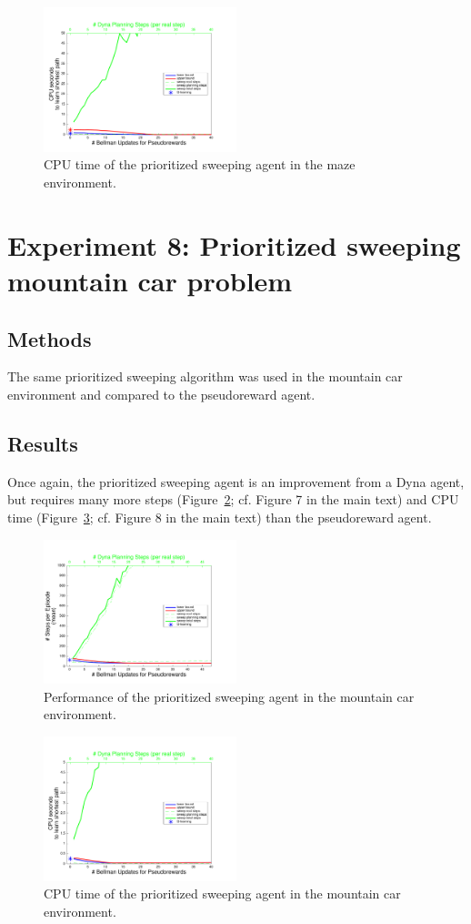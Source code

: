 \documentclass[letterpaper]{article}
\begin{document}
\begin{figure}[ht]
\centering
\includegraphics[width=0.5\textwidth]{cpus_vs_PRiterations_sweeping_toGoal}
\caption{CPU time of the prioritized sweeping agent in the maze environment.}
\label{fig:S5b}
\end{figure}

\section{Experiment 8: Prioritized sweeping mountain car problem}

\subsection{Methods}

The same prioritized sweeping algorithm was used in the mountain car environment and compared to the pseudoreward agent.

\subsection{Results}

Once again, the prioritized sweeping agent is an improvement from a Dyna agent, but requires many more steps (Figure~\ref{fig:S6a}; cf. Figure 7 in the main text) and CPU time (Figure~\ref{fig:S6b}; cf. Figure 8 in the main text) than the pseudoreward agent.

\begin{figure}[ht]
\centering
\includegraphics[width=0.5\textwidth]{MC_learning_vs_PRiterationsSweeping_DYNA_mean}
\caption{Performance of the prioritized sweeping agent in the mountain car environment.}
\label{fig:S6a}
\end{figure}

\begin{figure}[ht]
\centering
\includegraphics[width=0.5\textwidth]{MC_cpus_vs_PRiterations_sweeping_toGoal}
\caption{CPU time of the prioritized sweeping agent in the mountain car environment.}
\label{fig:S6b}
\end{figure}
\end{document}
